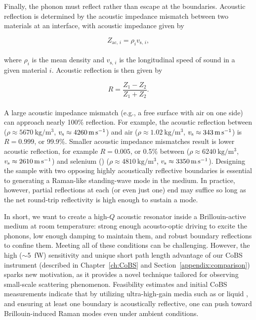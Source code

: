 Finally, the phonon must reflect rather than escape at the boundaries. Acoustic reflection is determined by the acoustic impedance mismatch between two materials at an interface, with acoustic impedance given by

\begin{equation}
  Z_{\mathrm{ac,}\,i} = \rho_{i} v_{\mathrm{s,}\,i},
  \label{eq:Raman:acoustic impedance}
\end{equation}
\\
where \(\rho_{i}\) is the mean density and \(v_{\mathrm{s,}\,i}\) is the longitudinal speed of sound in a given material \(i\). Acoustic reflection is then given by

\begin{equation}
  R = \frac{Z_{1} - Z_{2}}{Z_{1} + Z_{2}}.
  \label{eq:Raman:acoustic reflectivity}
\end{equation}
\\
A large acoustic impedance mismatch (e.g., a free surface with air on one side) can approach nearly 100\% reflection. \cite{galliou2013extremely, auld1973acoustic} For example, the acoustic reflection between  (\(\rho \approx \SI{5670}{\kilo\gram\per\cubic\meter}\), \(v_{\rm s} \approx \SI{4260}{\meter\per\second}\)) and air (\(\rho \approx \SI{1.02}{\kilo\gram\per\cubic\meter}\), \(v_{\rm s} \approx \SI{343}{\meter\per\second}\)) is \(R = 0.999\), or 99.9\%. Smaller acoustic impedance mismatches result is lower acoustic reflection, for example \(R = 0.005\), or 0.5\% between  (\(\rho \approx \SI{6240}{\kilo\gram\per\cubic\meter}\), \(v_{\rm s} \approx \SI{2610}{\meter\per\second}\)) and selenium () (\(\rho \approx \SI{4810}{\kilo\gram\per\cubic\meter}\), \(v_{\rm s} \approx \SI{3350}{\meter\per\second}\)). Designing the sample with two opposing highly acoustically reflective boundaries is essential to generating a Raman-like standing-wave mode in the medium. In practice, however, partial reflections at each (or even just one) end may suffice so long as the net round‐trip reflectivity is high enough to sustain a mode.

In short, we want to create a high-\(Q\) acoustic resonator inside a Brillouin-active medium at room temperature: strong enough acousto-optic driving to excite the phonons, low enough damping to maintain them, and robust boundary reflections to confine them. Meeting all of these conditions can be challenging. However, the high (\(\sim\)\SI{5}{\femto\watt}) sensitivity and unique short path length advantage of our \ac{CoBS} instrument (described in Chapter~\ref{ch:CoBS} and Section~\ref{appendix:comparison}) sparks new motivation, as it provides a novel technique tailored for observing small-scale scattering phenomenon. Feasibility estimates and initial \ac{CoBS} measurements indicate that by utilizing ultra-high-gain media such as  \cite{sanghera2010nonlinear, abedin2005observation} or liquid  \cite{boyd2020nonlinear}, and ensuring at least one boundary is acoustically reflective, one can push toward Brillouin-induced Raman modes even under ambient conditions.

